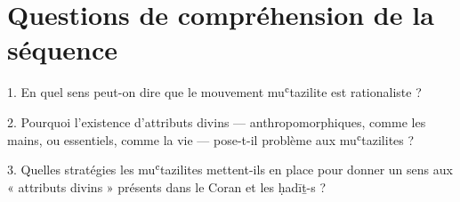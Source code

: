 \section{Questions de compréhension de la séquence}
 
   1. En quel sens peut-on dire que le mouvement muʿtazilite est rationaliste ?
   
   
   2. Pourquoi l’existence d’attributs divins — anthropomorphiques, comme les mains, ou essentiels, comme la vie — pose-t-il problème aux muʿtazilites ? 
   
   
   3. Quelles stratégies les muʿtazilites mettent-ils en place pour donner un sens aux « attributs divins » présents dans le Coran et les ḥadīṯ-s ? 
